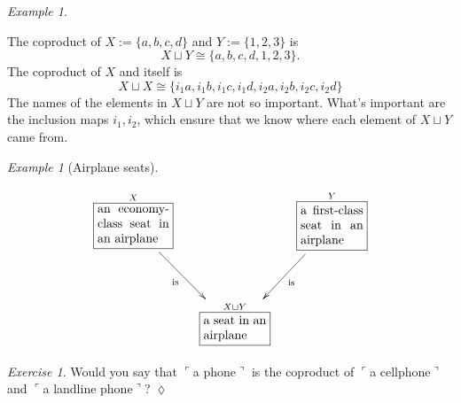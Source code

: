 \documentclass{book}
\def\tn{\textnormal}
\def\iso{\cong}
\newcommand{\LA}[2]{\ar[#1]^-{\tn {#2}}}
\newcommand{\LAL}[2]{\ar[#1]_-{\tn {#2}}}
\newcommand{\obox}[3]{\stackrel{#1}{\fbox{\parbox{#2}{#3}}}}
\newcommand{\fakebox}[1]{\tn{$\ulcorner$#1$\urcorner$}}
\theoremstyle{remark}
\newtheorem{example}[subsubsection]{Example}
\newtheorem{exc}[subsubsection]{Exercise}
\newenvironment{exercise}{\begin{exc}}{\hspace*{\fill}$\lozenge$\end{exc}}
\theoremstyle{definition}
\begin{document}
\begin{example}\label{ex:coproduct}

The coproduct of $X:=\{a,b,c,d\}$ and $Y:=\{1,2,3\}$ is $$X\sqcup Y\iso\{a,b,c,d,1,2,3\}.$$ The coproduct of $X$ and itself is $$X\sqcup X\iso\{i_1a,i_1b,i_1c,i_1d,i_2a,i_2b,i_2c,i_2d\}$$ 
The names of the elements in $X\sqcup Y$ are not so important. What's important are the inclusion maps $i_1,i_2$, which ensure that we know where each element of $X\sqcup Y$ came from.

\end{example}

\begin{example}[Airplane seats]\label{ex:airplanes}

\begin{align}\label{dia:airplane}
\xymatrix@=15pt{
\obox{X}{.8in}{an economy-class seat in an airplane}\LAL{ddr}{is}&&\obox{Y}{.7in}{a first-class seat in an airplane}\LA{ddl}{is}\\\\
&\obox{X\sqcup Y}{.7in}{a seat in an airplane}
}
\end{align}

\end{example}

\begin{exercise}
Would you say that \fakebox{a phone} is the coproduct of \fakebox{a cellphone} and \fakebox{a landline phone}? 
\end{exercise}
\end{document}
